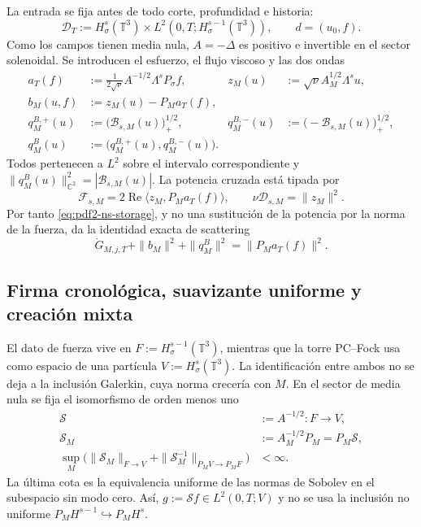 La entrada se fija antes de todo corte, profundidad e historia:
\begin{equation}\label{eq:pdf2-ns-data-space}
 \mathcal D_T:=H^s_\sigma(\mathbb T^3)
 \times L^2(0,T;H^{s-1}_\sigma(\mathbb T^3)),
 \qquad d=(u_0,f).
\end{equation}
Como los campos tienen media nula, $A=-\Delta$ es positivo e invertible en el
sector solenoidal. Se introducen el esfuerzo, el flujo viscoso y las dos ondas
\begin{equation}\label{eq:pdf2-ns-force-waves}
 \begin{aligned}
 a_T(f)&:=\frac{1}{2\sqrt\nu}A^{-1/2}\Lambda^sP_\sigma f,
 &z_M(u)&:=\sqrt\nu A_M^{1/2}\Lambda^su,\\
 b_M(u,f)&:=z_M(u)-P_Ma_T(f),\\
 q_M^{B,+}(u)&:=\bigl(\mathscr B_{s,M}(u)\bigr)_+^{1/2},
 &q_M^{B,-}(u)&:=\bigl(-\mathscr B_{s,M}(u)\bigr)_+^{1/2},\\
 q_M^B(u)&:=\bigl(q_M^{B,+}(u),q_M^{B,-}(u)\bigr).
 \end{aligned}
\end{equation}
Todos pertenecen a $L^2$ sobre el intervalo correspondiente y
$\|q_M^B(u)\|_{\mathbb C^2}^2=|\mathscr B_{s,M}(u)|$.
La potencia cruzada está tipada por
\begin{equation}\label{eq:pdf2-ns-cross-power}
 \mathscr F_{s,M}=2\operatorname{Re}\langle z_M,P_Ma_T(f)\rangle,
 \qquad \nu\mathscr D_{s,M}=\|z_M\|^2.
\end{equation}
Por tanto \eqref{eq:pdf2-ns-storage}, y no una sustitución de la potencia por la
norma de la fuerza, da la identidad exacta de scattering
\begin{equation}\label{eq:pdf2-ns-scattering-balance}
 \dot G_{M,j,T}+\|b_M\|^2+\|q^B_M\|^2=\|P_Ma_T(f)\|^2.
\end{equation}

\subsection{Firma cronológica, suavizante uniforme y creación mixta}

El dato de fuerza vive en $F:=H^{s-1}_\sigma(\mathbb T^3)$, mientras que la
torre PC--Fock usa como espacio de una partícula
$V:=H^s_\sigma(\mathbb T^3)$. La identificación entre ambos no se deja a la
inclusión Galerkin, cuya norma crecería con $M$. En el sector de media nula se
fija el isomorfismo de orden menos uno
\begin{equation}\label{eq:pdf2-ns-uniform-smoother}
 \begin{aligned}
 \mathscr S&:=A^{-1/2}:F\longrightarrow V,\\
 \mathscr S_M&:=A_M^{-1/2}P_M=P_M\mathscr S,\\
 \sup_M\bigl(\|\mathscr S_M\|_{F\to V}
 +\|\mathscr S_M^{-1}\|_{P_MV\to P_MF}\bigr)&<\infty.
 \end{aligned}
\end{equation}
La última cota es la equivalencia uniforme de las normas de Sobolev en el
subespacio sin modo cero. Así, $g:=\mathscr Sf\in L^2(0,T;V)$ y no se usa la
inclusión no uniforme $P_MH^{s-1}\hookrightarrow P_MH^s$.

